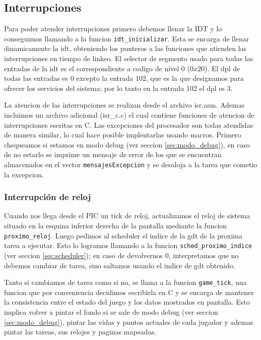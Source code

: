 \subsection{Interrupciones}

Para poder atender interrupciones primero debemos llenar la IDT y lo conseguimos llamando a la funcion \verb|idt_inicializar|. Esta se encarga de llenar dinamicamente la idt, obteniendo los punteros a las funciones que atienden las interrupciones en tiempo de linkeo. El selector de segmento usado para todas las entradas de la idt es el correspondiente a codigo de nivel 0 ($0x20$). El dpl de todas las entradas es 0 excepto la entrada 102, que es la que designamos para ofrecer los servicios del sistema; por lo tanto en la entrada 102 el dpl es 3.

La atencion de las interrupciones se realizan desde el archivo isr.asm. Ademas incluimos un archivo adicional (isr_c.c) el cual contiene funciones de atencion de interrupciones escritas en C. 
Las excepciones del procesador son todas atendidas de manera similar, lo cual hace posible implentarlas usando macros. Primero chequeamos si estamos en modo debug (ver seccion \ref{sec:modo_debug}), en caso de no estarlo se imprime un mensaje de error de los que se encuentran almacenados en el vector \verb|mensajesExcepcion| y se desaloja a la tarea que cometio la excepcion. 



\subsubsection{Interrupción de reloj}

\label{subsec:int-reloj}

Cuando nos llega desde el PIC un tick de reloj, actualizamos el reloj de sistema situado en la esquina inferior derecha de la pantalla mediante la funcion \verb|proximo_reloj|. Luego pedimos al scheduler el indice de la gdt de la proxima tarea a ejecutar. Esto lo logramos llamando a la funcion \verb|sched_proximo_indice| (ver seccion \ref{sec:scheduler}); en caso de devolvernos 0, interpretamos que no debemos cambiar de tarea, sino saltamos usando el indice de gdt obtenido.

Tanto si cambiamos de tarea como si no, se llama a la funcion \verb|game_tick|, una funcion que por conveniencia decidimos escribirla en C y se encarga de mantener la consistencia entre el estado del juego y los datos mostrados en pantalla. Esto implica volver a pintar el fondo si se sale de modo debug (ver seccion \ref{sec:modo_debug}), pintar las vidas y puntos actuales de cada jugador y ademas pintar las tareas, sus relojes y p\´aginas mapeadas.




